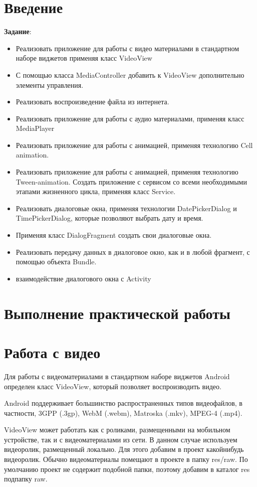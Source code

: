 \section*{\LARGE{Введение}}

\textbf{Задание}:
\begin{itemize}
	\item Реализовать приложение для работы с видео материалами в
		стандартном наборе виджетов применяя класс VideoView
	\item С помощью класса MediaController добавить к VideoView
		дополнительно элементы управления.
	\item Реализовать воспроизведение файла из интернета.
	\item Реализовать приложение для работы с аудио материалами, применяя
		класс MediaPlayer
	\item Реализовать приложение для работы с анимацией, применяя
		технологию Cell animation.
	\item Реализовать приложение для работы с анимацией, применяя
		технологию Tween-animation. Создать приложение с сервисом со
		всеми необходимыми этапами жизненного цикла, применяя класс
		Service.
	\item Реализовать диалоговые окна, применяя технологии DatePickerDialog и
		TimePickerDialog, которые позволяют выбрать дату и время.
	\item Применяя класс DialogFragment создать свои диалоговые окна.
	\item Реализовать передачу данных в диалоговое окно, как и в любой
		фрагмент, с помощью объекта Bundle.
	\item взаимодействие диалогового окна с Activity
\end{itemize}

\clearpage

\section*{\LARGE{Выполнение практической работы}}

\section{Работа с видео}
Для работы с видеоматериалами в стандартном наборе виджетов Android
определен класс VideoView, который позволяет воспроизводить видео.\par
Android поддерживает большинство распространенных типов видеофайлов,
в частности, 3GPP (.3gp), WebM (.webm), Matroska (.mkv), MPEG-4 (.mp4).\par
VideoView может работать как с роликами, размещенными на мобильном
устройстве, так и с видеоматериалами из сети. В данном случае используем
видеоролик, размещенный локально. Для этого добавим в проект какойнибудь видеоролик. Обычно видеоматериалы помещают в проекте в папку
res/raw. По умолчанию проект не содержит подобной папки, поэтому
добавим в каталог res подпапку raw.

